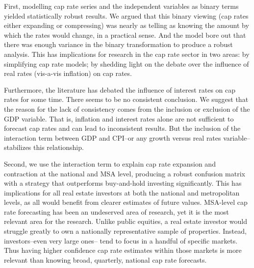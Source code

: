 First, modelling cap rate series and the independent variables as binary terms yielded statistically robust results. We argued that this binary viewing (cap rates either expanding or compressing) was nearly as telling as knowing the amount by which the rates would change, in a practical sense. And the model bore out that there was enough variance in the binary transformation to produce a robust analysis. This has implications for research in the cap rate sector in two areas: by simplifying cap rate models; by shedding light on the debate over the influence of real rates (vis-a-vis inflation) on cap rates.

Furthermore, the literature has debated the influence of interest rates on cap rates for some time. There seems to be no consistent conclusion. We suggest that the reason for the lack of consistency comes from the inclusion or exclusion of the GDP variable. That is, inflation and interest rates alone are not sufficient to forecast cap rates and can lead to inconsistent results. But the inclusion of the interaction term between GDP and CPI--or any growth versus real rates variable-- stabilizes this relationship.

Second, we use the interaction term to explain cap rate expansion and contraction at the national and MSA level, producing a robust confusion matrix with a strategy that outperforms buy-and-hold investing significantly. This has implications for all real estate investors at both the national and metropolitan levels, as all would benefit from clearer estimates of future values. MSA-level cap rate forecasting has been an undeserved area of research, yet it is the most relevant area for the research. Unlike public equities, a real estate investor would struggle greatly to own a nationally representative sample of properties. Instead, investors--even very large ones-- tend to focus in a handful of specific markets. Thus having higher confidence cap rate estimates within those markets is more relevant than knowing broad, quarterly, national cap rate forecasts.

